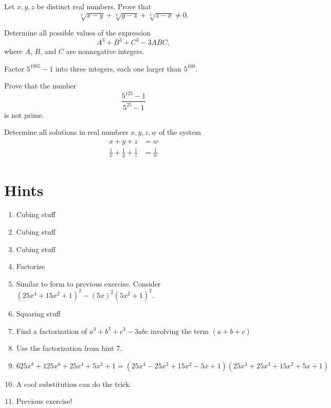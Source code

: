 \documentclass{article}
\begin{document}
\begin{exercise}[Hint: 7]
Let \(x,y,z\) be distinct real numbers.
Prove that
\[\sqrt[3]{x-y} + \sqrt[3]{y-z} + \sqrt[3]{z-x} \neq 0.\]
\end{exercise}

\begin{exercise}[2019 A1, Hint: 8]
Determine all possible values of the expression
\[A^3 + B^3 + C^3 - 3ABC,\]
where \(A\), \(B\), and \(C\) are nonnegative integers.
\end{exercise}

\begin{exercise}[Hint: 9]
Factor $5^{1985}-1$ into three integers, each one larger than $5^{100}$.
\end{exercise}

\begin{exercise}[Hint: 5]
Prove that the number
\[\frac{5^{125}-1}{5^{25}-1}\]
is not prime.
\end{exercise}

\begin{exercise}[1977 A2]
Determine all solutions in real numbers $x,y,z,w$ of the system
\begin{align*}
    x+y+z&= w \\
    \frac{1}{x}+\frac{
    1}{y}+\frac{1}{z} &= \frac{1}{w}
\end{align*}
\end{exercise}

\newpage 
\section{Hints}

\begin{enumerate}
    \item Cubing stuff
    \item Cubing stuff
    \item Cubing stuff
    \item Factorize
    \item Similar to form to previous exercise. Consider $(25x^4+15x^2+1)^2-(5x)^2(5x^2+1)^2$.
    \item Squaring stuff
    \item Find a factorization of \(a^3+b^3+c^3-3abc\) involving the term \((a+b+c)\)
    \item Use the factorization from hint 7.
    \item $625x^8 + 125x^6 + 25x^4 + 5x^2 + 1 = (25x^4-25x^3+15x^2-5x+1)(25x^4+25x^3+15x^2+5x+1)$
    \item A cool substitution can do the trick.
    \item Previous exercise!
\end{enumerate}
\end{document}
